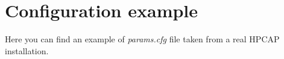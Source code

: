 \documentclass[a4paper,oneside]{hpman}
\begin{document}




\appendix
\chapter{Configuration example}
\label{sec:example}

Here you can find an example of \textit{params.cfg} file taken from a real HPCAP installation.

{
}



\nocite{*}


\end{document}
